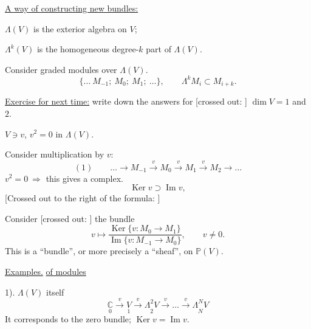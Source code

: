 \underline{A way of constructing new bundles:}

$\Lambda(V)$ is the exterior algebra on $V$;

$\Lambda^k(V)$ is the homogeneous degree-$k$ part of $\Lambda(V)$.

Consider graded modules over $\Lambda(V)$.
\begin{equation*}
\{\ldots\ M_{-1};\ M_0;\ M_1;\ \ldots\},
\qquad \Lambda^kM_i\subset M_{i+k}.
\end{equation*}

\underline{Exercise for next time:} write down the answers for
[crossed out:
]
$\dim V=1$ and $2$.

$V\ni v$, $v^2=0$ in $\Lambda(V)$.

Consider multiplication by $v$:
\begin{equation*}
(1)\qquad
\ldots\to M_{-1}\overset{v}{\longrightarrow}M_0
\overset{v}{\longrightarrow}M_1\overset{v}{\longrightarrow}M_2\to\ldots
\end{equation*}
$v^2=0\ \Rightarrow$ this gives a complex.
\begin{equation*}
\operatorname{Ker}v\supset\operatorname{Im}v,
\end{equation*}
[Crossed out to the right of the formula:
]

Consider [crossed out:
]
the bundle
\begin{equation*}
v\longmapsto
\frac{\operatorname{Ker}\{v:M_0\to M_1\}}
{\operatorname{Im}\{v:M_{-1}\to M_0\}},\qquad v\ne0.
\end{equation*}
This is a “bundle”, or more precisely a “sheaf”, on $\mathbb P(V)$.

\underline{Examples.}\newline
\underline{of modules}

1). $\Lambda(V)$ itself
\begin{equation*}
\underset{0}{\mathbb C}\overset{v}{\longrightarrow}
\underset{1}{V}\overset{v}{\longrightarrow}
\underset{2}{\Lambda^2V}\overset{v}{\longrightarrow}
\ldots\overset{v}{\longrightarrow}\underset{N}{\Lambda^NV}
\end{equation*}
It corresponds to the zero bundle; $\operatorname{Ker}v=\operatorname{Im}v$.

